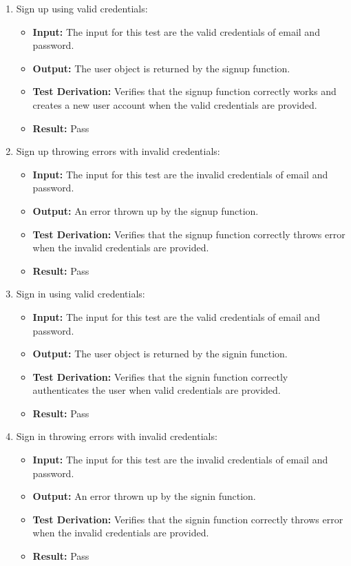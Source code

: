 \documentclass[12pt, titlepage]{article}
\begin{document}
  \begin{enumerate}
    \item Sign up using valid credentials:
      \begin{itemize}
        \item \textbf{Input:} The input for this test are the valid credentials of email and password.
        \item \textbf{Output:} The user object is returned by the signup function.
        \item \textbf{Test Derivation:} Verifies that the signup function correctly works and creates a new user account when the valid credentials are provided.
        \item \textbf{Result:} Pass 
      \end{itemize}

    \item Sign up throwing errors with invalid credentials:
      \begin{itemize}
        \item \textbf{Input:} The input for this test are the invalid credentials of email and password.
        \item \textbf{Output:} An error thrown up by the signup function.
        \item \textbf{Test Derivation:} Verifies that the signup function correctly throws error when the invalid credentials are provided.
        \item \textbf{Result:} Pass 
      \end{itemize}

    \item Sign in using valid credentials:
      \begin{itemize}
        \item \textbf{Input:} The input for this test are the valid credentials of email and password. 
        \item \textbf{Output:} The user object is returned by the signin function.
        \item \textbf{Test Derivation:}  Verifies that the signin function correctly authenticates the user when valid credentials are provided.
        \item \textbf{Result:} Pass 
      \end{itemize}

    \item Sign in throwing errors with invalid credentials:
      \begin{itemize}
        \item \textbf{Input:} The input for this test are the invalid credentials of email and password. 
        \item \textbf{Output:} An error thrown up by the signin function.
        \item \textbf{Test Derivation:} Verifies that the signin function correctly throws error when the invalid credentials are provided.
        \item \textbf{Result:} Pass 
      \end{itemize}
  \end{enumerate}
\end{document}
